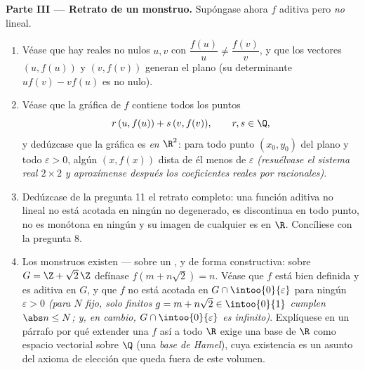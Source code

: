 \begin{problem}[{Problema del fin de semana --- $f(x + y) = f(x) + f(y)$:
la regularidad fuerza la linealidad, y el retrato de los monstruos}]
\medskip
\noindent\textbf{Parte III --- Retrato de un monstruo.} Supóngase
ahora $f$ aditiva pero \emph{no} lineal.
\begin{enumerate}[resume]
  \item Véase que hay reales no nulos $u, v$ con
        $\dfrac{f(u)}{u} \neq \dfrac{f(v)}{v}$, y que los vectores
        $(u, f(u))$ y $(v, f(v))$ generan el plano (su determinante
        $u f(v) - v f(u)$ es no nulo).
  \item Véase que la gráfica de $f$ contiene todos los puntos
        \[
        r\,(u, f(u)) + s\,(v, f(v)), \qquad r, s \in \Q ,
        \]
        y dedúzcase que la gráfica es \emph{ en $\R^2$}: para
        todo punto $(x_0, y_0)$ del plano y todo $\varepsilon > 0$,
        algún $(x, f(x))$ dista de él menos de $\varepsilon$
        \emph{(resuélvase el sistema real $2\times2$ y aproxímense
        después los coeficientes reales por racionales)}.
  \item Dedúzcase de la pregunta 11 el retrato completo: una función
        aditiva no lineal no está acotada en ningún  no
        degenerado, es discontinua en todo punto, no es monótona en
        ningún  y su imagen de cualquier  es 
        en $\R$. Concíliese con la pregunta 8.
  \item Los monstruos existen --- sobre un  , y de forma
        constructiva: sobre $G = \Z + \sqrt2\,\Z$ defínase
        $f(m + n\sqrt2) = n$. Véase que $f$ está bien definida y es
        aditiva en $G$, y que $f$ no está acotada en
        $G \cap \intoo{0}{\varepsilon}$ para ningún $\varepsilon > 0$
        \emph{(para $N$ fijo, solo finitos $g = m + n\sqrt2 \in
        \intoo{0}{1}$ cumplen $\abs n \leq N$; y, en cambio,
        $G \cap \intoo{0}{\varepsilon}$ es infinito)}. Explíquese en
        un párrafo por qué extender una $f$ así a todo $\R$ exige una
        base de $\R$ como espacio vectorial sobre $\Q$ (una
        \emph{base de Hamel}), cuya existencia es un asunto del axioma
        de elección que queda fuera de este volumen.
\end{enumerate}


\end{problem}
